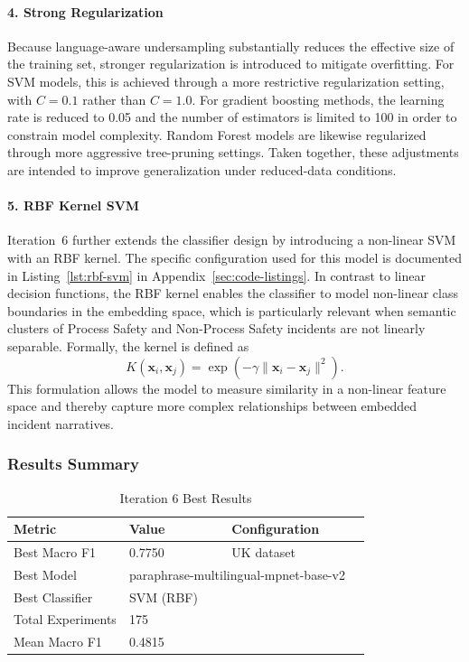 \documentclass[11pt, titlepage, bibliography=totoc]{scrreprt}
\begin{document}
\paragraph{4. Strong Regularization}
Because language-aware undersampling substantially reduces the effective size of the training set, stronger regularization is introduced to mitigate overfitting. For SVM models, this is achieved through a more restrictive regularization setting, with $C = 0.1$ rather than $C = 1.0$. For gradient boosting methods, the learning rate is reduced to 0.05 and the number of estimators is limited to 100 in order to constrain model complexity. Random Forest models are likewise regularized through more aggressive tree-pruning settings. Taken together, these adjustments are intended to improve generalization under reduced-data conditions.

\paragraph{5. RBF Kernel SVM}
Iteration~6 further extends the classifier design by introducing a non-linear SVM with an RBF kernel. The specific configuration used for this model is documented in Listing~\ref{lst:rbf-svm} in Appendix~\ref{sec:code-listings}. In contrast to linear decision functions, the RBF kernel enables the classifier to model non-linear class boundaries in the embedding space, which is particularly relevant when semantic clusters of Process Safety and Non-Process Safety incidents are not linearly separable. Formally, the kernel is defined as
\begin{equation}
K(\mathbf{x}_i, \mathbf{x}_j) = \exp\left(-\gamma \|\mathbf{x}_i - \mathbf{x}_j\|^2\right).
\end{equation}
This formulation allows the model to measure similarity in a non-linear feature space and thereby capture more complex relationships between embedded incident narratives.

\subsubsection{Results Summary}

\begin{table}[htbp]
\centering
\caption{Iteration 6 Best Results}
\label{tab:iter6-results}
\begin{tabular}{@{}llll@{}}
\toprule
\textbf{Metric} & \textbf{Value} & \textbf{Configuration} \\
\midrule
Best Macro F1 & 0.7750 & UK dataset \\
Best Model & \multicolumn{2}{l}{paraphrase-multilingual-mpnet-base-v2} \\
Best Classifier & SVM (RBF) & \\
Total Experiments & 175 & \\
Mean Macro F1 & 0.4815 & \\
\bottomrule
\end{tabular}
\end{table}
\end{document}
